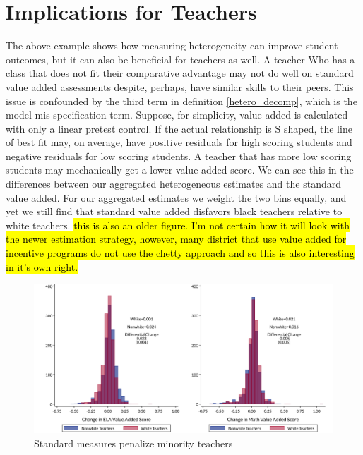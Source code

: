 \documentclass[12pt]{article}
\theoremstyle{definition}
\theoremstyle{definition}
\theoremstyle{definition}
\theoremstyle{definition}
\begin{document}
\section{Implications for Teachers} \label{twell}

The above example shows how measuring heterogeneity can improve student outcomes, but it can also be beneficial for teachers as well. A teacher Who has a class that does not fit their comparative advantage may not do well on standard value added assessments despite, perhaps, have similar skills to their peers. This issue is confounded by the third term in definition \ref{hetero_decomp}, which is the model mis-specification term. Suppose, for simplicity, value added is calculated with only a linear pretest control. If the actual relationship is S shaped, the line of best fit may, on average, have positive residuals for high scoring students and negative residuals for low scoring students. A teacher that has more low scoring students may mechanically get a lower value added score. We can see this in the differences between our aggregated heterogeneous estimates and the standard value added. For our aggregated estimates we weight the two bins equally, and yet we still find that standard value added disfavors black teachers relative to white teachers. \hl{this is also an older figure. I'm not certain how it will look with the newer estimation strategy, however, many district that use value added for incentive programs do not use the chetty approach and so this is also interesting in it's own right.}

\begin{figure}[H]
    \centering
    \includegraphics[width=.9\textwidth]{Working_Paper/WP_Figures/fig5_racial.pdf}
    \caption{Standard measures penalize minority teachers}
    \label{fig:my_label}
    
\end{figure}
\end{document}
